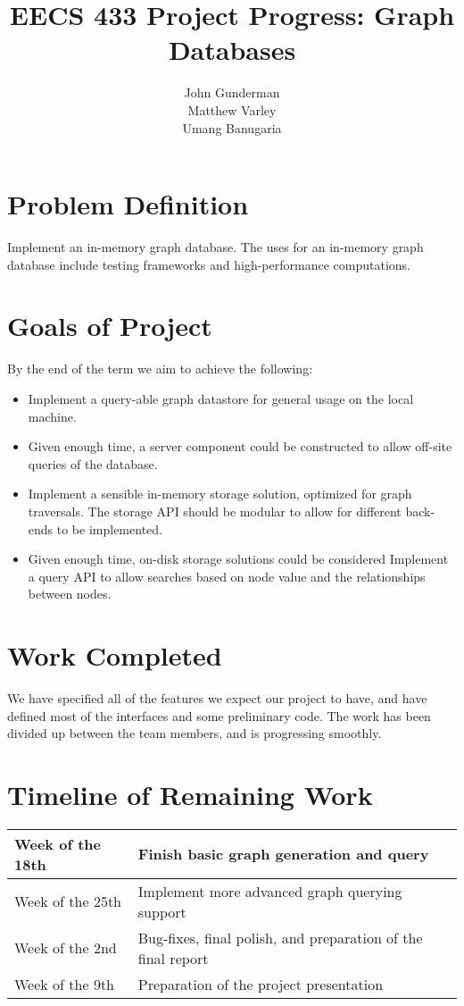 \documentclass[11pt]{article}
\title{EECS 433 Project Progress: Graph Databases}
\author{John Gunderman\\
		Matthew Varley\\
		Umang Banugaria}
\date{}
\begin{document}
\maketitle
\tableofcontents

\section{Problem Definition}
Implement an in-memory graph database. The uses for an in-memory graph database include testing frameworks and high-performance computations.

\section{Goals of Project}
By the end of the term we aim to achieve the following:

\begin{itemize}
\item Implement a query-able graph datastore for general usage on the local machine.
\item Given enough time, a server component could be constructed to allow off-site queries of the database.
\item Implement a sensible in-memory storage solution, optimized for graph traversals. The storage API should be modular to allow for different back-ends to be implemented.
\item Given enough time, on-disk storage solutions could be considered
Implement a query API to allow searches based on node value and the relationships between nodes.
\end{itemize}

\section{Work Completed}

We have specified all of the features we expect our project to have, and have defined most of the interfaces and some preliminary code. The work has been divided up between the team members, and is progressing smoothly.

\section{Timeline of Remaining Work}

\begin{tabular}{|l|l|}
\hline
Week of the 18th & Finish basic graph generation and query\\\hline
Week of the 25th & Implement more advanced graph querying support\\\hline
Week of the 2nd & Bug-fixes, final polish, and preparation of the final report\\\hline
Week of the 9th & Preparation of the project presentation\\\hline
\end{tabular}
\end{document}
